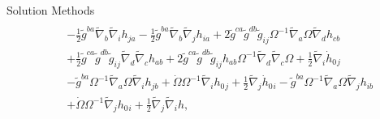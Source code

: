 \documentclass[8pt,aspectratio=1610]{beamer}
\begin{document}
\begin{frame}{Solution Methods}
\begin{eqnarray}
		\nonumber\\
		&& -  \tfrac{1}{2} \tilde{g}^{ba} \tilde{\nabla}_{b}\tilde{\nabla}_{i}h_{ja} -  \tfrac{1}{2} \tilde{g}^{ba} \tilde{\nabla}_{b}\tilde{\nabla}_{j}h_{ia} + 2 \tilde{g}^{ca} \tilde{g}^{db} \tilde{g}_{ij} \Omega^{-1} \tilde{\nabla}_{a}\Omega \tilde{\nabla}_{d}h_{cb} 
		\nonumber\\
		&& + \tfrac{1}{2} \tilde{g}^{ca} \tilde{g}^{db} \tilde{g}_{ij} \tilde{\nabla}_{d}\tilde{\nabla}_{c}h_{ab}  + 2 \tilde{g}^{ca} \tilde{g}^{db} \tilde{g}_{ij} h_{ab} \Omega^{-1} \tilde{\nabla}_{d}\tilde{\nabla}_{c}\Omega + \tfrac{1}{2} \tilde{\nabla}_{i}\dot{h}_{0}{}_{j} 
		\nonumber\\
		&& -  \tilde{g}^{ba} \Omega^{-1} \tilde{\nabla}_{a}\Omega \tilde{\nabla}_{i}h_{jb} + \dot{\Omega} \Omega^{-1} \tilde{\nabla}_{i}h_{0}{}_{j} + \tfrac{1}{2} \tilde{\nabla}_{j}\dot{h}_{0}{}_{i} -  \tilde{g}^{ba} \Omega^{-1} \tilde{\nabla}_{a}\Omega \tilde{\nabla}_{j}h_{ib}
		\nonumber\\
		&&  + \dot{\Omega} \Omega^{-1} \tilde{\nabla}_{j}h_{0}{}_{i} + \tfrac{1}{2} \tilde{\nabla}_{j}\tilde{\nabla}_{i}h,
	\end{eqnarray}

\end{frame}



\end{document}
